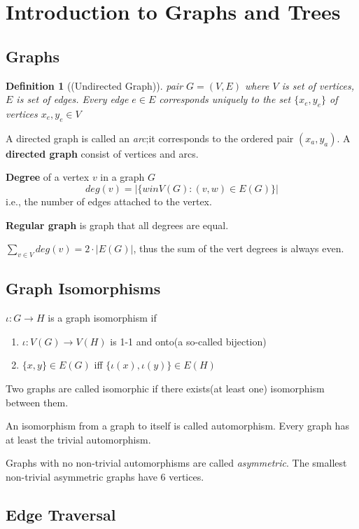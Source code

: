 \documentclass{ctexart}
\newtheorem{definition}{\indent Definition}[section]
\begin{document}
\section{Introduction to Graphs and Trees}

\subsection{Graphs}

\begin{definition}[(Undirected Graph)]
    pair $G = (V, E)$ where $V$ is set of vertices, $E$ is set of edges.
    Every edge $e \in E$ corresponds uniquely to the set $\{ x_e,y_e\}$ of vertices $x_e,y_e \in V$
\end{definition}

A directed graph is called an \textit{arc};it corresponds to the ordered pair $(x_a,y_a)$.
A \textbf{directed graph} consist of vertices and arcs.

\textbf{Degree} of a vertex $v$ in a graph $G$
\[
    deg(v) = \left\lvert \{ w in V(G): (v,w) \in E(G)\}\right\rvert 
\]
i.e., the number of edges attached to the vertex.

\textbf{Regular graph} is graph that all degrees are equal.

$\sum_{v \in V}deg(v) = 2 \cdot \left\lvert E(G)\right\rvert$, thus the sum of the vert degrees is always even.

\subsection{Graph Isomorphisms}

$\iota : G \rightarrow H$ is a graph isomorphism if
\begin{enumerate}
    \item $\iota : V(G) \rightarrow V(H)$ is 1-1 and onto(a so-called bijection)
    \item $\{x, y\} \in E(G)$ iff $\{\iota(x),\iota(y) \} \in E(H)$
\end{enumerate}
Two graphs are called isomorphic if there exists(at least one) isomorphism between them.

An isomorphism from a graph to itself is called automorphism. Every graph has at least the trivial automorphism.

Graphs with no non-trivial automorphisms are called \textit{asymmetric}. The smallest non-trivial asymmetric graphs have 6 vertices.

\subsection{Edge Traversal}
\end{document}
